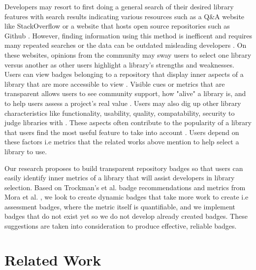 \documentclass[12pt, letterpaper]{article}
\begin{document}
Developers may resort to first doing a general search of their desired library features with 
search results indicating
various resources such as a Q\&A website like StackOverflow \cite{stackoverflow} or 
a website that hosts open source repositories such as Github \cite{github}. However, finding information using
this method is inefficent and requires many repeated searches or the data can be outdated
misleading developers \cite{analogical}. On
these websites, opinions from the community
\cite{opinerarticle} may sway users to select one library versus another as other users highlight
a library's strengths and weaknesses. 
Users can view badges belonging to a repository that display inner aspects of a library that are
more accessible to view
\cite{githubbadges}. Visible cues or metrics that are transparent allows users
to see community support, how "alive" a library is, and to help users assess a project's real value
\cite{metrics,transparency}. Users may also dig up other library characteristics like functionality, usability,
quality, compatability, security to judge libraries with \cite{githubbadges,metrics,librarytrends}. 
These aspects often contribute to the popularity of a library
\cite{librarytrends, apiwave} that users find the most useful feature to take into account \cite{empiricalmetrics}.
Users depend on these factors i.e metrics that the related works above mention to help select a library to use. 


Our research proposes to build transparent repository badges so that users can 
easily identify inner metrics of a library
that will assist developers in library selection. 
Based on Trockman's et al. \cite{githubbadges} badge recommendations and metrics from Mora et al. \cite{metrics},
we look to create 
dynamic badges that take more work to create i.e assessment badges, where the metric itself is quantifiable, and
we implement badges that do not exist yet so we do not develop already created badges.
These suggestions are taken into consideration to produce effective, reliable
badges.


\section{Related Work}
\end{document}
